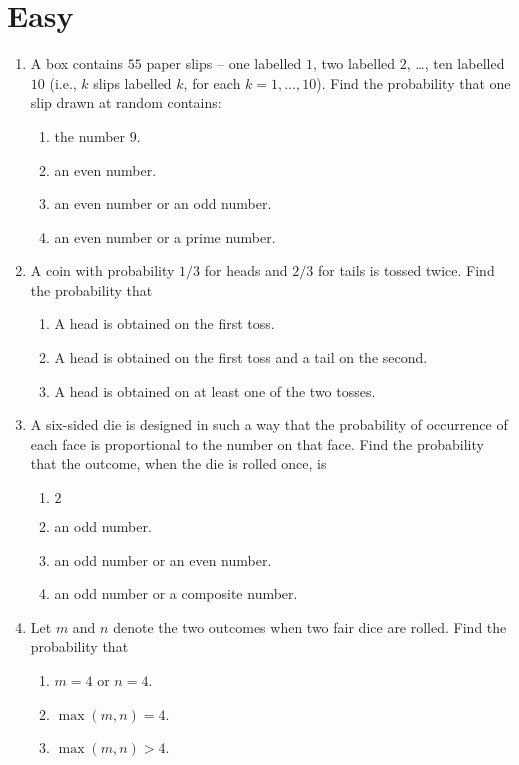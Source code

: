 \documentclass[svgnames]{amsart}
\begin{document}
\section{Easy}
\begin{enumerate}
\item A box contains $55$ paper slips -- one labelled $1$, two labelled $2$, \ldots, ten labelled $10$ (i.e., $k$ slips labelled $k$, for each $k = 1, \ldots, 10$). Find the probability that one slip drawn at random contains:
\begin{enumerate}
	\item the number $9$.
	\item an even number.
	\item an even number or an odd number.
	\item an even number or a prime number.
\end{enumerate}

\item A coin with probability $1/3$ for heads and $2/3$ for tails is tossed twice. Find the probability that
\begin{enumerate}
	\item A head is obtained on the first toss.
	\item A head is obtained on the first toss and a tail on the second.
	\item A head is obtained on at least one of the two tosses.
\end{enumerate}

\item A six-sided die is designed in such a way that the probability of occurrence of each face is proportional to the number on that face. Find the probability that the outcome, when the die is rolled once, is
\begin{enumerate}
	\item $2$
	\item an odd number.
	\item an odd number or an even number.
	\item an odd number or a composite number.
\end{enumerate}

\item Let $m$ and $n$ denote the two outcomes when two fair dice are rolled. Find the probability that
\begin{enumerate}
	\item $m = 4$ or $n = 4$.
	\item $\max(m, n) = 4$.
	\item $\max(m, n) > 4$.
\end{enumerate}


\end{enumerate}
\end{document}
